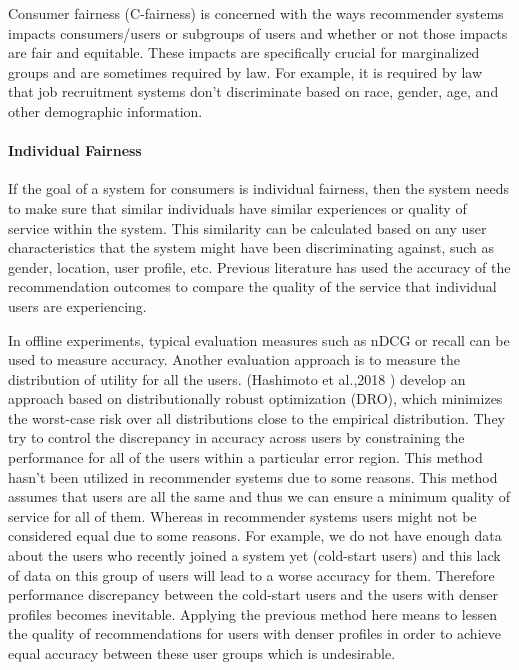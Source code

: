             Consumer fairness (C-fairness) is concerned with the ways recommender systems impacts consumers/users or subgroups of users and whether or not those impacts are fair and equitable. These impacts are specifically crucial for marginalized groups and are sometimes required by law. For example, it is required by law that job recruitment systems don't discriminate based on race, gender, age, and other demographic information.
        
            \vspace{0.25cm}
            \noindent \paragraph{Individual Fairness}
            \vspace{0.25cm}
            
                If the goal of a system for consumers is individual fairness, then the system needs to make sure that similar individuals have similar experiences or quality of service within the system. This similarity can be calculated based on any user characteristics that the system might have been discriminating against, such as gender, location, user profile, etc. Previous literature has used the accuracy of the recommendation outcomes to compare the quality of the service that individual users are experiencing. 
            
                In offline experiments, typical evaluation measures such as nDCG or recall can be used to measure accuracy. Another evaluation approach is to measure the distribution of utility for all the users. (Hashimoto et al.,2018 \cite{hashimoto2018fairness}) develop an approach based on distributionally robust optimization (DRO), which minimizes the worst-case risk over all distributions close to the empirical distribution. They try to control the discrepancy in accuracy across users by constraining the performance for all of the users within a particular error region. This method hasn't been utilized in recommender systems due to some reasons. This method assumes that users are all the same and thus we can ensure a minimum quality of service for all of them. Whereas in recommender systems users might not be considered equal due to some reasons. For example, we do not have enough data about the users who recently joined a system yet (cold-start users) and this lack of data on this group of users will lead to a worse accuracy for them. Therefore performance discrepancy between the cold-start users and the users with denser profiles becomes inevitable. Applying the previous method here means to lessen the quality of recommendations for users with denser profiles in order to achieve equal accuracy between these user groups which is undesirable.
            
